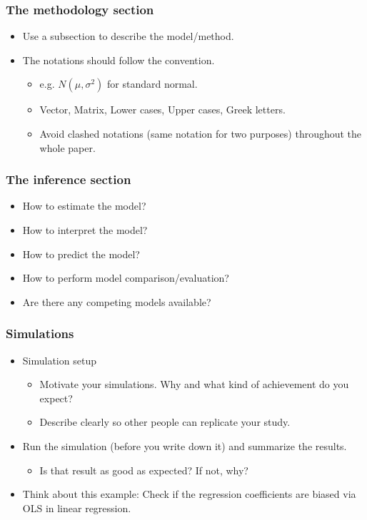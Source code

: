 \documentclass[10pt]{beamer}
\begin{document}
\begin{frame}
  \frametitle{The methodology section}
  \begin{itemize}
  \item Use a subsection to describe the model/method.
  \item The notations should follow the convention.
    \begin{itemize}
    \item e.g. $N(\mu,\sigma^2)$ for standard normal.
    \item Vector, Matrix, Lower cases, Upper cases, Greek letters.
    \item Avoid clashed notations (same notation for two purposes) throughout
      the whole paper.
    \end{itemize}
  \end{itemize}
\end{frame}

\begin{frame}
  \frametitle{The inference section}

  \begin{itemize}
  \item How to estimate the model?
  \item How to interpret the model?
  \item How to predict the model?
  \item How to perform model comparison/evaluation?
  \item Are there any competing models available?
  \end{itemize}
\end{frame}


\begin{frame}
\frametitle{Simulations}

\begin{itemize}
\item Simulation setup
  \begin{itemize}
  \item Motivate your simulations. Why and what kind of achievement do you expect?
  \item Describe clearly so other people can replicate your study.
  \end{itemize}
  \item Run the simulation (before you write down it) and summarize the results.

    \begin{itemize}
    \item Is that result as good as expected? If not, why?
    \end{itemize}

\item Think about this example: Check if the regression coefficients are biased
  via OLS in linear regression.

\end{itemize}

\end{frame}
\end{document}

